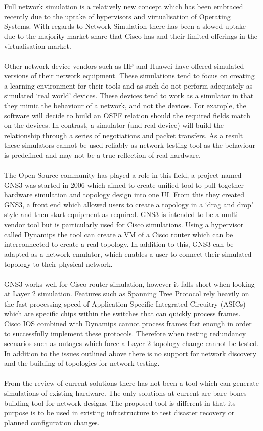\documentclass[11pt]{report}
\begin{document}
Full network simulation is a relatively new concept which has been embraced recently due to the uptake of hypervisors and virtualisation of Operating Systems. With regards to Network Simulation there has been a slowed uptake due to the majority market share that Cisco has and their limited offerings in the virtualisation market.
\\
\\
Other network device vendors such as HP and Huawei have offered simulated versions of their network equipment. These simulations tend to focus on creating a learning environment for their tools and as such do not perform adequately as simulated ‘real world’ devices. These devices tend to work as a simulator in that they mimic the behaviour of a network, and not the devices. For example, the software will decide to build an OSPF relation should the required fields match on the devices. In contrast, a simulator (and real device) will build the relationship through a series of negotiations and packet transfers. As a result these simulators cannot be used reliably as network testing tool as the behaviour is predefined and may not be a true reflection of real hardware.
\\
\\
The Open Source community has played a role in this field, a project named GNS3 was started in 2006 which aimed to create  unified tool to pull together hardware simulation and topology design into one UI. From this they created GNS3, a front end which allowed users to create a topology in a ‘drag and drop’ style and then start equipment as required. GNS3 is intended to be a multi-vendor tool but is particularly used for Cisco simulations. Using a hypervisor called Dynamips the tool can create a VM of a Cisco router which can be interconnected to create a real topology. In addition to this, GNS3 can be adapted as a network emulator, which enables a user to connect their simulated topology to their physical network.
\\
\\
GNS3 works well for Cisco router simulation, however it falls short when looking at Layer 2 simulation. Features such as Spanning Tree Protocol rely heavily on the fast processing speed of Application Specific Integrated Circuitry (ASICs) which are specific chips within the switches that can quickly process frames. Cisco IOS combined with Dynamips cannot process frames fast enough in order to successfully implement these protocols. Therefore when testing redundancy scenarios such as outages which force a Layer 2 topology change cannot be tested. In addition to the issues outlined above there is no support for network discovery and the building of topologies for network testing.
\\
\\
From the review of current solutions there has not been a tool which can generate simulations of existing hardware. The only solutions at current are bare-bones building tool for network designs. The proposed tool is different in that its purpose is to be used in existing infrastructure to test disaster recovery or planned configuration changes.
\end{document}
